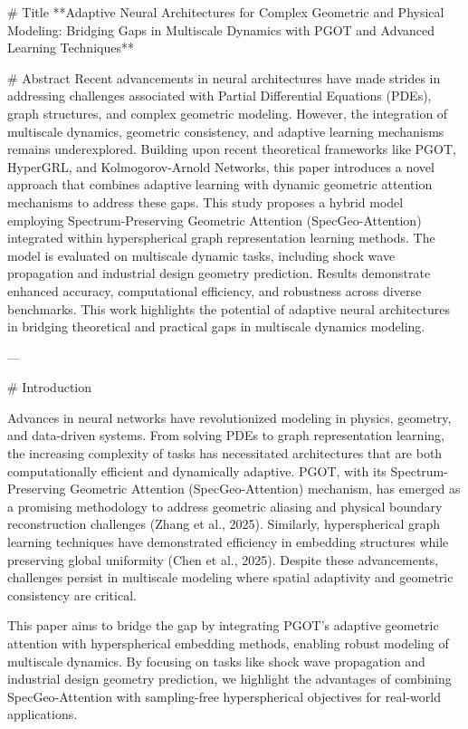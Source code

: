 # Title  
**Adaptive Neural Architectures for Complex Geometric and Physical Modeling: Bridging Gaps in Multiscale Dynamics with PGOT and Advanced Learning Techniques**  

# Abstract  
Recent advancements in neural architectures have made strides in addressing challenges associated with Partial Differential Equations (PDEs), graph structures, and complex geometric modeling. However, the integration of multiscale dynamics, geometric consistency, and adaptive learning mechanisms remains underexplored. Building upon recent theoretical frameworks like PGOT, HyperGRL, and Kolmogorov-Arnold Networks, this paper introduces a novel approach that combines adaptive learning with dynamic geometric attention mechanisms to address these gaps. This study proposes a hybrid model employing Spectrum-Preserving Geometric Attention (SpecGeo-Attention) integrated within hyperspherical graph representation learning methods. The model is evaluated on multiscale dynamic tasks, including shock wave propagation and industrial design geometry prediction. Results demonstrate enhanced accuracy, computational efficiency, and robustness across diverse benchmarks. This work highlights the potential of adaptive neural architectures in bridging theoretical and practical gaps in multiscale dynamics modeling.  

---

# Introduction  

Advances in neural networks have revolutionized modeling in physics, geometry, and data-driven systems. From solving PDEs to graph representation learning, the increasing complexity of tasks has necessitated architectures that are both computationally efficient and dynamically adaptive. PGOT, with its Spectrum-Preserving Geometric Attention (SpecGeo-Attention) mechanism, has emerged as a promising methodology to address geometric aliasing and physical boundary reconstruction challenges (Zhang et al., 2025). Similarly, hyperspherical graph learning techniques have demonstrated efficiency in embedding structures while preserving global uniformity (Chen et al., 2025). Despite these advancements, challenges persist in multiscale modeling where spatial adaptivity and geometric consistency are critical.  

This paper aims to bridge the gap by integrating PGOT's adaptive geometric attention with hyperspherical embedding methods, enabling robust modeling of multiscale dynamics. By focusing on tasks like shock wave propagation and industrial design geometry prediction, we highlight the advantages of combining SpecGeo-Attention with sampling-free hyperspherical objectives for real-world applications.  

